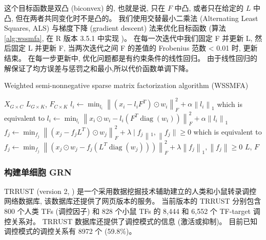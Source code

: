 这个目标函数是双凸 (biconvex) 的, 也就是说, 只在 $F$ 中凸, 或者只在给定的 $L$ 中凸, 但在两者共同变化时不是凸的。
我们使用交替最小二乘法 (Alternating Least Squares, ALS) 与梯度下降 (gradient descent) 法来优化目标函数 (算法 \ref{alg:wssmfa}, 
在 R 版本 3.5.1 中实现 )。
在每一次迭代中我们固定 F 并更新 L, 然后固定 L 并更新 F, 当两次迭代之间 F 的差值的 Frobenius 范数 < 0.01 时, 更新结束。
在每一步更新中, 优化问题都是有约束条件的线性回归。
由于线性回归的解保证了均方误差与惩罚之和最小,所以代价函数单调下降。
\begin{algorithm}
    \caption{Weighted semi-nonnegative sparse matrix factorization algorithm (WSSMFA)}
    \label{alg:wssmfa}
    \begin{algorithmic}[1]
    \Require  $X_{G \times C}$                                   
    \Ensure $L_{G \times K}$, $F_{C \times K}$                
                \State $l_{i} \leftarrow \min _{l_{i}}\left\|\left(x_{i}-l_{i} F^{T}\right) \odot w_{i}\right\|_{F}^{2}+\alpha\left\|l_{i}\right\|_{1}$
                \State which is equivalent to 
                \State $l_{i} \leftarrow \min _{l_{i}}\left\|x_{i} \odot w_{i}-l_{i}\left(F^{T} \operatorname{diag}\left(w_{i}\right)\right)\right\|_{F}^{2}+\alpha\left\|l_{i}\right\|_{1}$
            \EndFor
                \State $f_{j} \leftarrow \min _{f_{j}}\left\|\left(x_{j}-f_{j} L^{T}\right) \odot w_{j}\right\|_{F}^{2}+\lambda \mid f_{j}\left\|_{1},\right\| f_{j} \| \geq 0$
                \State which is equivalent to 
                \State $f_{j} \leftarrow \min _{f_{j}}\left\|\left(x_{j} \odot w_{j}-f_{j}\left(L^{T} \operatorname{diag}\left(w_{j}\right)\right)\right)\right\|_{F}^{2}+\lambda\left\|f_{j}\right\|_{1},\left\|f_{j}\right\| \geq 0$
            \EndFor
        \EndWhile  
        \State \Return $L$, $F$        
  \end{algorithmic}
\end{algorithm}

\subsubsection{构建单细胞 GRN}
TRRUST (version 2, ) 是一个采用数据挖掘技术辅助建立的人类和小鼠转录调控网络数据库,
该数据库还提供了网页版本的服务。
当前版本的 TRRUST 分别包含 800 个人类 TFs (调控因子) 和 828 个小鼠 TFs 的 8,444 和 6,552 个 TF-target 调控关系对。
TRRUST 数据库还提供了调控模式的信息 (激活或抑制)。
目前已知调控模式的调控关系有 8972 个 (59.8\%)。

